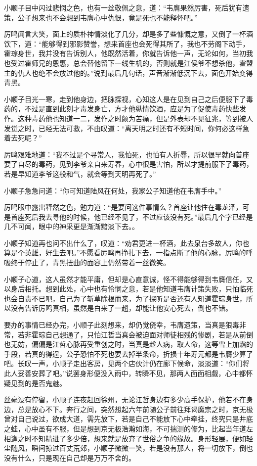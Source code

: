 小顺子目中闪过悲悯之色，也有一丝敬佩之意，道：“韦膺果然厉害，死后犹有遗策，公子想来也不会想到韦膺心中仇恨，竟是死也不能释怀吧。”

厉鸣闻言大笑，面上的质朴神情淡化了几分，却是多了些慷慨之意，又倒了一杯酒饮下，道：“能够得到邪影赞誉，想来首座也会死得其所了，我也不劳阁下动手，霍琮身世，我并没有告诉别人，他既然活着，你就告诉他一声，无论如何，当初我也受过霍师兄的恩惠，总会替他留下一线生机的，否则就是江侯爷不想杀他，霍盟主的仇人也绝不会放过他的。”说到最后几句话，声音渐渐低沉下去，面色开始变得青黑。

小顺子目光一寒，走到他身边，把脉探视，心知这人是在见到自己之后便服下了毒药的，不过是直到此刻才毒发身亡，方才他纵情饮酒，应是为了促使毒药快些发作。这种毒药他也知道一二，发作之时颇为苦痛，但是外表却不见征兆，等到被人发觉之时，已经无法可救，不由叹道：“离天明之时还有不短时间，你何必这样急着去死呢？”

厉鸣艰难地道：“我不过是个寻常人，我怕死，也怕有人折辱，所以很早就向首座要了自尽的毒药，见到李爷亲自来寿春，心中很是害怕，所以才提前服下了毒药，若是早知道李爷这般和气，就会等到天明再死了。”

小顺子急急问道：“你可知道陆风在何处，我家公子知道他在韦膺手中。”

厉鸣眼中露出释然之色，勉力道：“是要问这件事情么？首座让他住在毒龙泽，可是首座死后我去寻他的时候，他已经不见了，不过应该没有死。”最后几个字已经是几不可闻，眼中的神采更是渐渐黯淡下去。。

小顺子知道再也问不出什么了，叹道：“劝君更进一杯酒，此去泉台多故人，你也算是个英雄，好生去吧。”不愿看厉鸣再挣扎下去，一指点断了他的心脉，厉鸣的呼吸终于停止了，青黑扭曲的面容上仍然带着一丝微笑。

小顺子心道，这人虽然才能平庸，但却是心直意诚，怪不得能够得到韦膺信任，又以身后相托。想到此处，心中也有怜悯之意，若是他知道韦膺计策失败，只怕临死也会自责不已吧，自己为了斩草除根而来，为了探听是否还有人知道霍琮身世，所以没有告诉厉鸣真相，虽然是白来了一趟，却能让他安心死去，倒也不错。

要办的事情已经办完，小顺子此刻想来，却仍觉侥幸，韦膺遗策，当真是狠毒非常，若非霍琮自己想通了，只怕江哲当真会被迫面对师徒相残的惨剧，若是从前倒也无妨，偏偏是江哲心脉再受重创之时，当真是趁人病，取人命，这等雪上加霜的手段，若真的得逞，公子恐怕不死也要去掉半条命，折损十年寿元都是韦膺少算了吧。长叹一声，小顺子走出客房，见两个店伙计仍在廊下候命，淡淡道：“你们将此人妥善安葬了吧。”说罢身形便没入雨中，转瞬不见，那两人面面相觑，心中都怀疑见到的是否鬼魅。

丝毫没有停留，小顺子连夜赶回徐州，无论江哲身边有多少高手保护，他若不在身边，总是放心不下。奔行之间，突然想起六年前随公子前往拜谒魔宗之时，京无极曾对自己说过，欲成大道，需先放下，若是自己不能放下心中牵挂，终究只是井底之蛙，心中虽有不服，但是想到京无极浩瀚如海，不可揣测的修为，比起当年道左相逢之时不知精进了多少倍，想来就是放弃了世俗之争的缘故。身形轻展，便如轻尘随风，瞬间掠过百丈荒郊，小顺子微微一笑，若是没有那人，将一切放下，倒也没有什么，只是现在自己却是万万不舍的。

